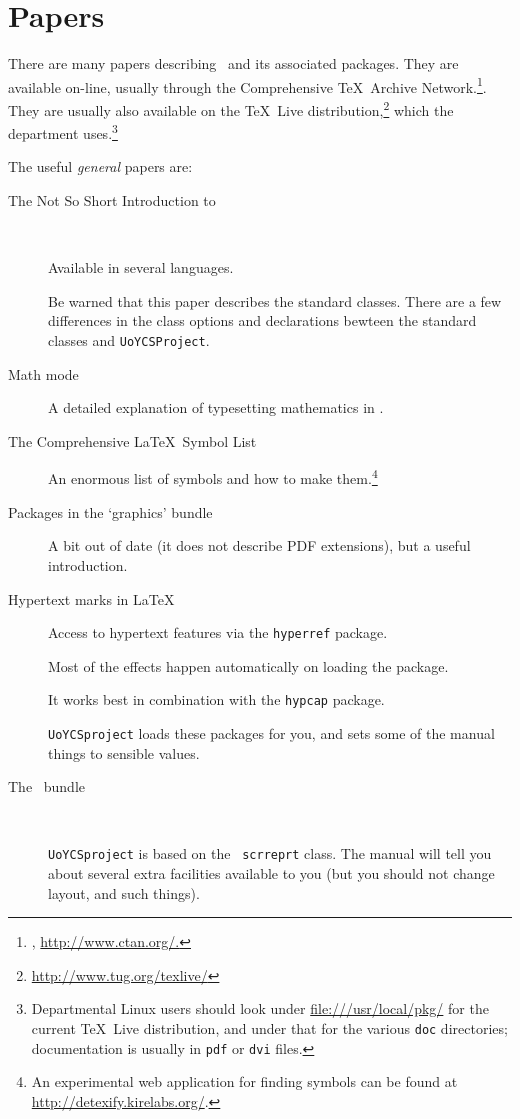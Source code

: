 \documentclass[authoryearcitations]{UoYCSproject}
\begin{document}
\section{Papers}
\label{sec:papers}

There are many papers describing \LaTeXe\ and its associated packages.
They are available on-line, usually through the Comprehensive \TeX\
Archive Network.\footnote{\CTAN, \url{http://www.ctan.org/.}}.  They
are usually also available on the \TeX~Live
distribution,\footnote{\url{http://www.tug.org/texlive/}} which the
department uses.\footnote{Departmental Linux users should look under
  \url{file:///usr/local/pkg/} for the current \TeX~Live distribution,
  and under that for the various \lstinline|doc| directories;
  documentation is usually in \lstinline|pdf| or \lstinline|dvi|
  files.}

The useful \emph{general} papers are:
\begin{description}
\item[The Not So Short Introduction to \LaTeXe\ 
  \citep{OetikerPartlHynaSchlegl2002}]\
  
  Available in several languages.
  
  Be warned that this paper describes the standard classes.  There are
  a few differences in the class options and declarations bewteen the
  standard classes and \lstinline|UoYCSProject|.
\item[Math mode \citep{Voss2007}] A detailed explanation of
  typesetting mathematics in \LaTeXe.
\item[The Comprehensive \LaTeX\ Symbol List \citep{Pakin2005}] An
  enormous list of symbols and how to make them.\footnote{An
    experimental web application for finding symbols can be found at
    \url{http://detexify.kirelabs.org/}.}
\item[Packages in the `graphics' bundle \citep{Carlisle1999}] A bit
  out of date (it does not describe PDF extensions), but a useful
  introduction.
\item[Hypertext marks in \LaTeX\ \citep{RahtzOberdiek2003}] Access to
  hypertext features via the \lstinline|hyperref| package.

  Most of the effects happen automatically on loading the package.

  It works best in combination with the \lstinline{hypcap} package.

  \lstinline|UoYCSproject| loads these packages for you, and sets some
  of the manual things to sensible values.
\item[The \KOMAScript\ bundle \citep{KohmMorawski2003}]\

  \lstinline|UoYCSproject| is based on the \KOMAScript\ 
  \lstinline|scrreprt| class.  The manual will tell you about several
  extra facilities available to you (but you should not change layout,
  and such things).
\end{description}
\end{document}
